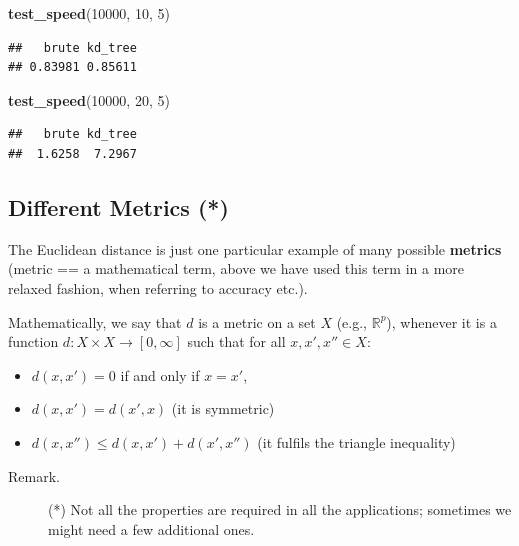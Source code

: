 \documentclass[10pt,b5paper,krantz1]{krantz}
\newenvironment{Shaded}{\begin{snugshade}}{\end{snugshade}}
\newcommand{\DecValTok}[1]{\textcolor[rgb]{0.06,0.06,0.06}{#1}}
\newcommand{\KeywordTok}[1]{\textcolor[rgb]{0.27,0.27,0.27}{\textbf{#1}}}
\newcommand{\NormalTok}[1]{#1}
\providecommand{\tightlist}{%
  \setlength{\itemsep}{0pt}\setlength{\parskip}{0pt}}
\begin{document}
\begin{Shaded}
\begin{Highlighting}[]
\KeywordTok{test_speed}\NormalTok{(}\DecValTok{10000}\NormalTok{, }\DecValTok{10}\NormalTok{, }\DecValTok{5}\NormalTok{)}
\end{Highlighting}
\end{Shaded}

\begin{verbatim}
##   brute kd_tree 
## 0.83981 0.85611
\end{verbatim}

\begin{Shaded}
\begin{Highlighting}[]
\KeywordTok{test_speed}\NormalTok{(}\DecValTok{10000}\NormalTok{, }\DecValTok{20}\NormalTok{, }\DecValTok{5}\NormalTok{)}
\end{Highlighting}
\end{Shaded}

\begin{verbatim}
##   brute kd_tree 
##  1.6258  7.2967
\end{verbatim}

\hypertarget{different-metrics}{%
\subsection{Different Metrics (*)}\label{different-metrics}}

The Euclidean distance is just one particular example
of many possible \textbf{metrics} (metric == a mathematical term,
above we have used this term in a more relaxed fashion, when referring
to accuracy etc.).

Mathematically, we say that \(d\) is a metric on a set \(X\)
(e.g., \(\mathbb{R}^p\)), whenever
it is a function \(d:X\times X\to [0,\infty]\) such that for all \(x,x',x''\in X\):

\begin{itemize}
\tightlist
\item
  \(d(x, x') = 0\) if and only if \(x=x'\),
\item
  \(d(x, x') = d(x', x)\) (it is symmetric)
\item
  \(d(x, x'') \le d(x, x') + d(x', x'')\) (it fulfils the triangle inequality)
\end{itemize}

\begin{description}
\item[Remark.]
(*) Not all the properties are required in all the applications;
sometimes we might need a few additional ones.
\end{description}
\end{document}
